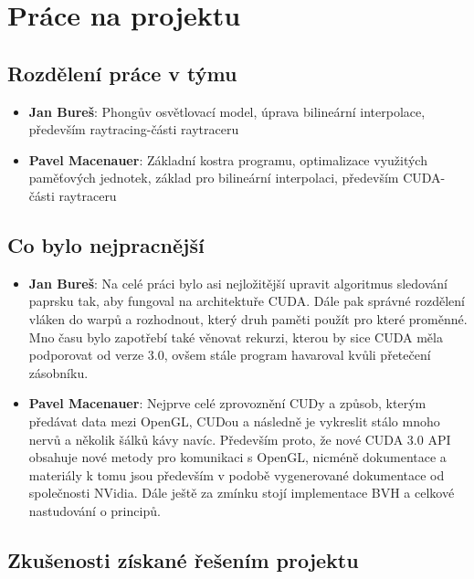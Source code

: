 \documentclass[12pt,a4paper,titlepage,final]{report}
\begin{document}
\chapter{Práce na projektu}

\section{Rozdělení práce v týmu}

\begin{itemize}
\item \textbf{Jan Bureš}: Phongův osvětlovací model, úprava bilineární interpolace, především raytracing-části raytraceru
\item \textbf{Pavel Macenauer}: Základní kostra programu, optimalizace využitých paměťových jednotek, základ pro bilineární interpolaci, především CUDA-části raytraceru 
\end{itemize}

\section{Co bylo nejpracnější}

\begin{itemize}
\item \textbf{Jan Bureš}: Na celé práci bylo asi nejložitější upravit algoritmus sledování paprsku tak, aby fungoval na architektuře CUDA. Dále pak správné rozdělení vláken do warpů a rozhodnout, který druh paměti použít pro které proměnné. Mno času bylo zapotřebí také věnovat rekurzi, kterou by sice CUDA měla podporovat od verze 3.0, ovšem stále program havaroval kvůli přetečení zásobníku.
\item \textbf{Pavel Macenauer}: Nejprve celé zprovoznění CUDy a způsob, kterým předávat data mezi OpenGL, CUDou a následně je vykreslit stálo mnoho nervů a několik šálků kávy navíc. Především proto, že nové CUDA 3.0 API obsahuje nové metody pro komunikaci s OpenGL, nicméně dokumentace a materiály k tomu jsou především v podobě vygenerované dokumentace od společnosti NVidia. Dále ještě za zmínku stojí implementace BVH a celkové nastudování o principů.
\end{itemize}


\section{Zkušenosti získané řešením projektu}
\end{document}
